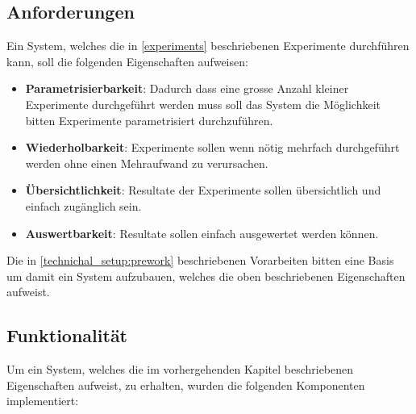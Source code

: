 \subsection{Anforderungen}
\label{technical_setup:requirements}
Ein System, welches die in \ref{experiments} beschriebenen Experimente durchführen kann, soll die folgenden Eigenschaften aufweisen:

\begin{itemize}
	\item \textbf{Parametrisierbarkeit}: Dadurch dass eine grosse Anzahl kleiner Experimente durchgeführt werden muss soll das System die Möglichkeit bitten Experimente parametrisiert durchzuführen.
	\item \textbf{Wiederholbarkeit}: Experimente sollen wenn nötig mehrfach durchgeführt werden ohne einen Mehraufwand zu verursachen. 
	\item \textbf{Übersichtlichkeit}: Resultate der Experimente sollen übersichtlich und einfach zugänglich sein.
	\item \textbf{Auswertbarkeit}: Resultate sollen  einfach ausgewertet werden können.
\end{itemize}

Die in \ref{technichal_setup:prework} beschriebenen Vorarbeiten bitten eine Basis um damit ein System aufzubauen, welches die oben beschriebenen Eigenschaften aufweist.
\subsection{Funktionalität}
\label{technical_setup:functionality}
Um ein System, welches die im vorhergehenden Kapitel beschriebenen Eigenschaften aufweist, zu erhalten, wurden die folgenden Komponenten implementiert:

